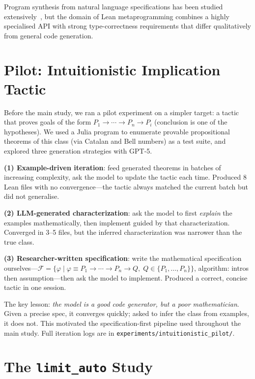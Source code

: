 \documentclass{llncs}
\begin{document}
Program synthesis from natural language specifications has been studied
extensively~\cite{gulwani2017program}, but the domain of
Lean metaprogramming combines a highly specialised API with strong
type-correctness requirements that differ qualitatively from general
code generation.

\section{Pilot: Intuitionistic Implication Tactic}

Before the main study, we ran a pilot experiment on a simpler target:
a tactic that proves goals of the form $P_1 \to \cdots \to P_n \to P_i$
(conclusion is one of the hypotheses).
We used a Julia program to enumerate provable propositional theorems
of this class (via Catalan and Bell numbers) as a test suite,
and explored three generation strategies with GPT-5.

\textbf{(1) Example-driven iteration}: feed generated theorems in batches
of increasing complexity, ask the model to update the tactic each time.
Produced 8 Lean files with no convergence---the tactic always matched
the current batch but did not generalise.

\textbf{(2) LLM-generated characterization}: ask the model to first
\emph{explain} the examples mathematically, then implement guided by
that characterization.  Converged in 3--5 files, but the inferred
characterization was narrower than the true class.

\textbf{(3) Researcher-written specification}: write the mathematical
specification ourselves---$\mathcal{F} = \{\varphi \mid \varphi \equiv
P_1 \to \cdots \to P_n \to Q,\; Q \in \{P_1,\ldots,P_n\}\}$, algorithm:
intros then assumption---then ask the model to implement.
Produced a correct, concise tactic in one session.

The key lesson: \emph{the model is a good code generator, but a poor
mathematician}.  Given a precise spec, it converges quickly; asked to
infer the class from examples, it does not.  This motivated the
specification-first pipeline used throughout the main study.
Full iteration logs are in \texttt{experiments/intuitionistic\_pilot/}.

\section{The \texttt{limit\_auto} Study}
\end{document}
